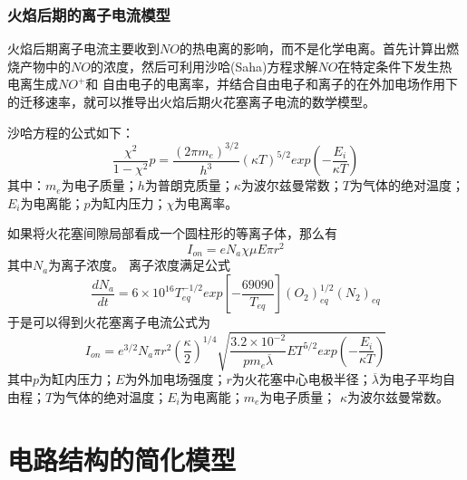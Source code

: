 \subsubsection*{火焰后期的离子电流模型}
火焰后期离子电流主要收到$NO$的热电离的影响，而不是化学电离。首先计算出燃烧产物中的$NO$的浓度，然后可利用沙哈(Saha)方程求解$NO$在特定条件下发生热电离生成$NO^{+}$和
自由电子的电离率，并结合自由电子和离子的在外加电场作用下的迁移速率，就可以推导出火焰后期火花塞离子电流的数学模型。\par 
沙哈方程的公式如下：
	\begin{equation}
		\frac{\chi^{2}}{1-\chi^{2}}p=\frac{(2\pi m_{e})^{3/2}}{h^{3}}(\kappa T)^{5/2}exp(-\frac{E_{i}}{\kappa T})
	\end{equation}
其中：$m_{e}$为电子质量；$h$为普朗克质量；$\kappa$为波尔兹曼常数；$T$为气体的绝对温度；$E_{i}$为电离能；$p$为缸内压力；$\chi$为电离率。\par 
如果将火花塞间隙局部看成一个圆柱形的等离子体，那么有
\begin{equation}
	I_{on}=eN_{a}\chi \mu E\pi r^{2}
\end{equation}
其中$N_{a}$为离子浓度。
离子浓度满足公式
\begin{equation}
	\frac{dN_{a}}{dt}=6\times10^{16}T_{eq}^{-1/2}exp[-\frac{69090}{T_{eq}}](O_{2})_{eq}^{1/2}(N_{2})_{eq}
\end{equation}
于是可以得到火花塞离子电流公式为
\begin{equation}
	I_{on}=e^{3/2}N_{a}\pi r^{2}(\frac{\kappa}{2})^{1/4}\sqrt{\frac{3.2\times10^{-2}}{pm_{e}\overline{\lambda}}ET^{5/2}exp(-\frac{E_{i}}{\kappa T})}
\end{equation}
其中$p$为缸内压力；$E$为外加电场强度；$r$为火花塞中心电极半径；$\overline{\lambda}$为电子平均自由程；$T$为气体的绝对温度；$E_{i}$为电离能；$m_{e}$为电子质量；
$\kappa$为波尔兹曼常数。
\section{电路结构的简化模型}
